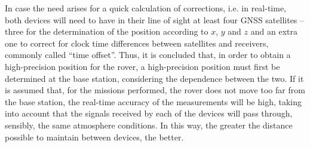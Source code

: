 In case the need arises for a quick calculation of corrections, i.e. in real-time, both devices will need to have in their line of sight at least four GNSS satellites -- three for the determination of the position according to $x$, $y$ and $z$ and an extra one to correct for clock time differences between satellites and receivers, commonly called ``time offset''. Thus, it is concluded that, in order to obtain a high-precision position for the rover, a high-precision position must first be determined at the base station, considering the dependence between the two. If it is assumed that, for the missions performed, the rover does not move too far from the base station, the real-time accuracy of the measurements will be high, taking into account that the signals received by each of the devices will pass through, sensibly, the same atmosphere conditions. In this way, the greater the distance possible to maintain between devices, the better.





